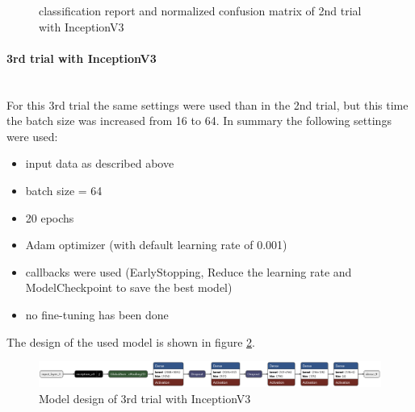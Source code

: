 \documentclass{article}
\begin{document}
\begin{figure}[!h]
  \centering
  \qquad
  \caption{classification report and normalized confusion matrix of 2nd trial with InceptionV3}
  \label{fig:inceptionv3_05_results}
\end{figure}

\paragraph{3rd trial with InceptionV3}\mbox{}\\
For this 3rd trial the same settings were used than in the 2nd trial, but this time the batch size was increased from 16 to 64. In summary the following settings were used: 
\begin{itemize}
\item input data as described above
\item batch size = 64
\item 20 epochs 
\item Adam optimizer (with default learning rate of 0.001)
\item callbacks were used (EarlyStopping, Reduce the learning rate and ModelCheckpoint to save the best model)
\item no fine-tuning has been done
\end{itemize}

The design of the used model is shown in figure \ref{fig:inceptionv3_06.keras_model_design}.
\begin{figure}[ht] %
    \centering
    \includegraphics[width=1.0\linewidth]{inceptionv3_06.keras_model_design_nice.png}
    \caption{Model design of 3rd trial with InceptionV3}
    \label{fig:inceptionv3_06.keras_model_design}
\end{figure}
\end{document}
